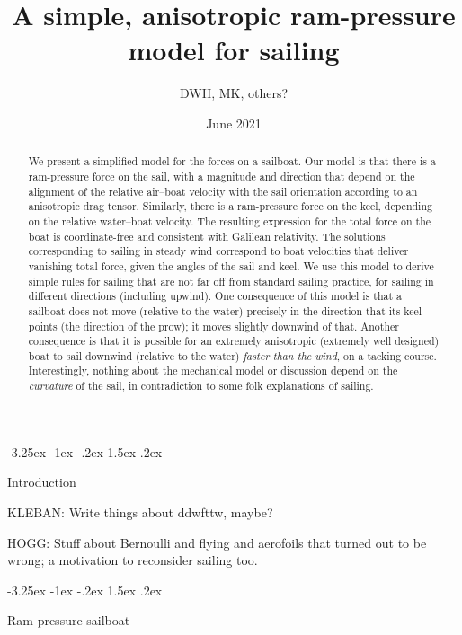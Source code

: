 \documentclass{article}
\title{\bfseries%
A simple, anisotropic ram-pressure model for sailing}
\author{DWH, MK, others?}
\date{June 2021}
\makeatletter
\renewcommand\section{\@startsection {section}{1}{\z@}%
  {-3.25ex \@plus -1ex \@minus -.2ex}%
  {1.5ex \@plus .2ex}%
  {\raggedright\normalfont\large\bfseries}}
\makeatother
\begin{document}
\maketitle

\begin{abstract}\noindent
    We present a simplified model for the forces on a sailboat.
    Our model is that there is a ram-pressure force on the sail, with a magnitude and direction that depend on the alignment of the relative air--boat velocity with the sail orientation according to an anisotropic drag tensor.
    Similarly, there is a ram-pressure force on the keel, depending on the relative water--boat velocity.
    The resulting expression for the total force on the boat is coordinate-free and consistent with Galilean relativity.
    The solutions corresponding to sailing in steady wind correspond to boat velocities that deliver vanishing total force, given the angles of the sail and keel.
    We use this model to derive simple rules for sailing that are not far off from standard sailing practice, for sailing in different directions (including upwind).
    One consequence of this model is that a sailboat does not move (relative to the water) precisely in the direction that its keel points (the direction of the prow); it moves slightly downwind of that.
    Another consequence is that it is possible for an extremely anisotropic (extremely well designed) boat to sail downwind (relative to the water) \emph{faster than the wind}, on a tacking course.
    Interestingly, nothing about the mechanical model or discussion depend on the \emph{curvature} of the sail, in contradiction to some folk explanations of sailing.
\end{abstract}

\section{Introduction}\label{sec:intro}

KLEBAN: Write things about ddwfttw, maybe?

HOGG: Stuff about Bernoulli and flying and aerofoils that turned out to be wrong; a motivation to reconsider sailing too.

\section{Ram-pressure sailboat}\label{sec:boat}
\end{document}
